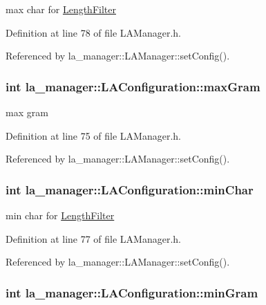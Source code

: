 max char for \hyperlink{classla__manager_1_1LengthFilter}{LengthFilter} 



Definition at line 78 of file LAManager.h.

Referenced by la\_\-manager::LAManager::setConfig().\hypertarget{classla__manager_1_1LAConfiguration_79b4e876fd224ec224b5572dfcc9ba6c}{
\subsubsection[{maxGram}]{\setlength{\rightskip}{0pt plus 5cm}int {\bf la\_\-manager::LAConfiguration::maxGram}}}
\label{classla__manager_1_1LAConfiguration_79b4e876fd224ec224b5572dfcc9ba6c}


max gram 



Definition at line 75 of file LAManager.h.

Referenced by la\_\-manager::LAManager::setConfig().\hypertarget{classla__manager_1_1LAConfiguration_7681232dc980fbacce77c82737244d86}{
\subsubsection[{minChar}]{\setlength{\rightskip}{0pt plus 5cm}int {\bf la\_\-manager::LAConfiguration::minChar}}}
\label{classla__manager_1_1LAConfiguration_7681232dc980fbacce77c82737244d86}


min char for \hyperlink{classla__manager_1_1LengthFilter}{LengthFilter} 



Definition at line 77 of file LAManager.h.

Referenced by la\_\-manager::LAManager::setConfig().\hypertarget{classla__manager_1_1LAConfiguration_f9d261511f52e4fd17b382bdfc03bab4}{
\subsubsection[{minGram}]{\setlength{\rightskip}{0pt plus 5cm}int {\bf la\_\-manager::LAConfiguration::minGram}}}
\label{classla__manager_1_1LAConfiguration_f9d261511f52e4fd17b382bdfc03bab4}


